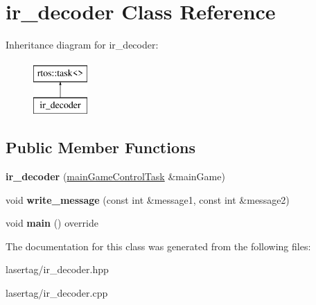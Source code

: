 \hypertarget{classir__decoder}{}\section{ir\+\_\+decoder Class Reference}
\label{classir__decoder}
Inheritance diagram for ir\+\_\+decoder\+:\begin{figure}[H]
\begin{center}
\leavevmode
\includegraphics[height=2.000000cm]{classir__decoder}
\end{center}
\end{figure}
\subsection*{Public Member Functions}
\begin{DoxyCompactItemize}
\item 
\mbox{\label{classir__decoder_a0a69c9508cf793ea50060666feece2f7}} 
{\bfseries ir\+\_\+decoder} (\mbox{\hyperlink{classmain_game_control_task}{main\+Game\+Control\+Task}} \&main\+Game)
\item 
\mbox{\label{classir__decoder_a84a8d41a1f2ea0bde2f90a997ab9e102}} 
void {\bfseries write\+\_\+message} (const int \&message1, const int \&message2)
\item 
\mbox{\label{classir__decoder_adb89a214025bd79b5cb3a67cfd861956}} 
void {\bfseries main} () override
\end{DoxyCompactItemize}


The documentation for this class was generated from the following files\+:\begin{DoxyCompactItemize}
\item 
lasertag/ir\+\_\+decoder.\+hpp\item 
lasertag/ir\+\_\+decoder.\+cpp\end{DoxyCompactItemize}
